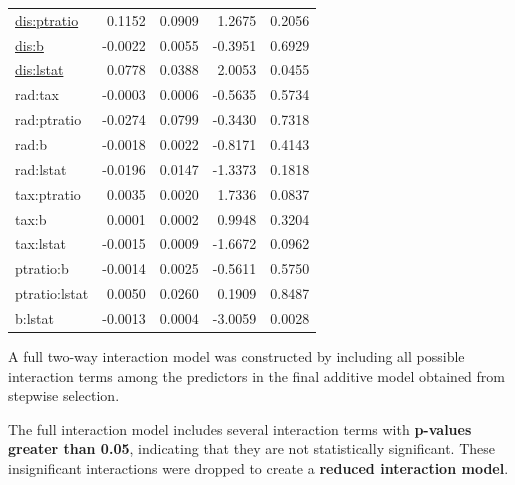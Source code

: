 \documentclass[
]{article}
\begin{document}
\begin{longtable}[]{@{}lrrrr@{}}
\url{dis:ptratio} & 0.1152 & 0.0909 & 1.2675 & 0.2056 \\
\url{dis:b} & -0.0022 & 0.0055 & -0.3951 & 0.6929 \\
\url{dis:lstat} & 0.0778 & 0.0388 & 2.0053 & 0.0455 \\
rad:tax & -0.0003 & 0.0006 & -0.5635 & 0.5734 \\
rad:ptratio & -0.0274 & 0.0799 & -0.3430 & 0.7318 \\
rad:b & -0.0018 & 0.0022 & -0.8171 & 0.4143 \\
rad:lstat & -0.0196 & 0.0147 & -1.3373 & 0.1818 \\
tax:ptratio & 0.0035 & 0.0020 & 1.7336 & 0.0837 \\
tax:b & 0.0001 & 0.0002 & 0.9948 & 0.3204 \\
tax:lstat & -0.0015 & 0.0009 & -1.6672 & 0.0962 \\
ptratio:b & -0.0014 & 0.0025 & -0.5611 & 0.5750 \\
ptratio:lstat & 0.0050 & 0.0260 & 0.1909 & 0.8487 \\
b:lstat & -0.0013 & 0.0004 & -3.0059 & 0.0028 \\
\end{longtable}

A full two-way interaction model was constructed by including all
possible interaction terms among the predictors in the final additive
model obtained from stepwise selection.

The full interaction model includes several interaction terms with
\textbf{p-values greater than 0.05}, indicating that they are not
statistically significant. These insignificant interactions were dropped
to create a \textbf{reduced interaction model}.
\end{document}
